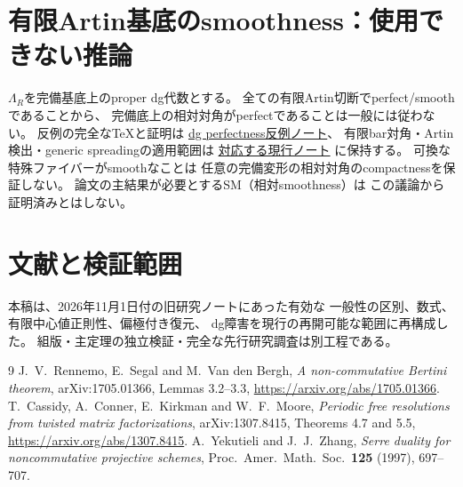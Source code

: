 \documentclass[11pt,a4paper]{ltjsarticle}
\begin{document}
\section{有限Artin基底のsmoothness：使用できない推論}
$\Lambda_R$を完備基底上のproper dg代数とする。
全ての有限Artin切断でperfect/smoothであることから、
完備底上の相対対角がperfectであることは一般には従わない。
反例の完全なTeXと証明は
\href{https://github.com/uedakazushi/nc-cubic2/blob/main/papers/relative_reconstruction/dg_perfectness_counterexamples.tex}{dg perfectness反例ノート}、
有限bar対角・Artin検出・generic spreadingの適用範囲は
\href{https://github.com/uedakazushi/nc-cubic2/blob/main/papers/relative_reconstruction/finite_bar_spreading.tex}{対応する現行ノート}
に保持する。
可換な特殊ファイバーがsmoothなことは
任意の完備変形の相対対角のcompactnessを保証しない。
論文の主結果が必要とするSM（相対smoothness）は
この議論から証明済みとはしない。

\section{文献と検証範囲}
本稿は、2026年11月1日付の旧研究ノートにあった有効な
一般性の区別、数式、有限中心値正則性、偏極付き復元、
dg障害を現行の再開可能な範囲に再構成した。
組版・主定理の独立検証・完全な先行研究調査は別工程である。
\begin{thebibliography}{9}
 J.\ V.\ Rennemo, E.\ Segal and M.\ Van den Bergh,
\emph{A non-commutative Bertini theorem}, arXiv:1705.01366,
Lemmas 3.2--3.3, \url{https://arxiv.org/abs/1705.01366}.
 T.\ Cassidy, A.\ Conner, E.\ Kirkman and W.\ F.\ Moore,
\emph{Periodic free resolutions from twisted matrix factorizations},
arXiv:1307.8415, Theorems 4.7 and 5.5,
\url{https://arxiv.org/abs/1307.8415}.
 A.\ Yekutieli and J.\ J.\ Zhang,
\emph{Serre duality for noncommutative projective schemes},
Proc.\ Amer.\ Math.\ Soc.\ \textbf{125} (1997), 697--707.
\end{thebibliography}
\end{document}
